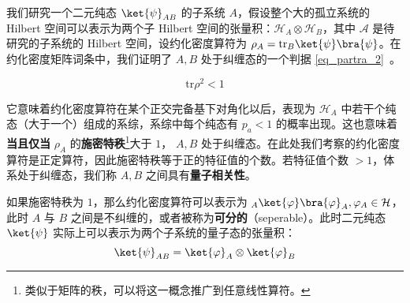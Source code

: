 

我们研究一个二元纯态 $\ket{\psi}_{AB}$ 的子系统 $A$，假设整个大的孤立系统的 Hilbert 空间可以表示为两个子 Hilbert 空间的张量积：$\mathcal{H}_A\otimes \mathcal{H}_B$，其中 $\mathcal A$ 是待研究的子系统的 Hilbert 空间，设约化密度算符为 $\rho_A=\text{tr}_B \ket{\psi}\bra{\psi}$。在约化密度矩阵词条中，我们证明了 $A,B$ 处于纠缠态的一个判据 \autoref{eq_partra_2}~。

\begin{equation}
\text{tr} \rho^2 <1
\end{equation}

它意味着约化密度算符在某个正交完备基下对角化以后，表现为 $\mathcal{H}_A$ 中若干个纯态（大于一个）组成的系综，系综中每个纯态有 $p_a<1$ 的概率出现。这也意味着\textbf{当且仅当} $\rho_A$ 的\textbf{施密特秩}\footnote{类似于矩阵的秩，可以将这一概念推广到任意线性算符。}大于 $1$， $A,B$ 处于纠缠态。在此处我们考察的约化密度算符是正定算符，因此施密特秩等于正的特征值的个数。若特征值个数 $>1$，体系处于纠缠态，我们称 $A,B$ 之间具有\textbf{量子相关性}。

如果施密特秩为 $1$，那么约化密度算符可以表示为 ${}_A\ket{\varphi}\bra{\varphi}_A,\varphi_A\in \mathcal{H}$，此时 $A$ 与 $B$ 之间是不纠缠的，或者被称为\textbf{可分的}（seperable）。此时二元纯态 $\ket{\psi}$ 实际上可以表示为两个子系统的量子态的张量积：
\begin{equation}
\ket{\psi}_{AB}=\ket{\varphi}_A\otimes \ket{\varphi}_B
\end{equation}
